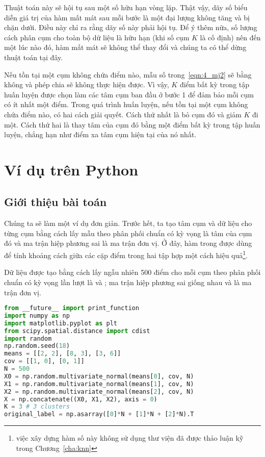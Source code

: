 Thuật toán này sẽ hội tụ sau một số hữu hạn vòng lặp. Thật vậy, dãy số biểu diễn giá trị của hàm mất mát sau mỗi bước là một đại
lượng không tăng và bị chặn dưới. Điều này chỉ ra rằng dãy số này phải hội tụ.
Để ý thêm nữa, số lượng cách phân cụm cho toàn bộ dữ liệu là hữu hạn (khi số
cụm $K$ là cố định) nên đến một lúc nào đó, hàm mất mát sẽ không thể thay
đổi và chúng ta có thể dừng thuật toán tại đây.

Nếu tồn tại một cụm không chứa điểm nào, mẫu số trong~\eqref{eqn:4_mj2} sẽ
bằng không và phép chia sẽ không thực hiện được. Vì vậy, $K$ điểm bất kỳ trong
tập huấn luyện được chọn làm các tâm cụm ban đầu ở bước 1 để đảm bảo mỗi
cụm có ít nhất một điểm. Trong quá trình huấn luyện, nếu tồn tại một cụm
không chứa điểm nào, có hai cách giải quyết. Cách thứ nhất là bỏ cụm đó
và giảm $K$ đi một. Cách thứ hai là thay tâm của cụm đó bằng một điểm
bất kỳ trong tập huấn luyện, chẳng hạn như điểm xa tâm cụm hiện tại của nó nhất.

\section{Ví dụ trên Python}


\subsection{Giới thiệu bài toán}
Chúng ta sẽ làm một ví dụ đơn giản. Trước hết, ta tạo tâm cụm và dữ liệu cho
từng cụm bằng cách lấy mẫu theo phân phối chuẩn có kỳ vọng là tâm của
cụm đó và ma trận hiệp phương sai là ma trận đơn vị. Ở đây, hàm
 trong  được dùng để
tính khoảng cách giữa các cặp điểm trong hai tập hợp một cách hiệu
quả\footnote{việc xây dựng hàm số này không sử dụng thư viện đã được thảo luận
kỹ trong Chương~\ref{cha:knn}}.

Dữ liệu được tạo bằng cách lấy ngẫu nhiên 500 điểm cho mỗi cụm theo phân
phối chuẩn có kỳ vọng lần lượt là  và
; ma trận hiệp phương sai giống nhau và là ma trận đơn vị.
\begin{lstlisting}[language=Python]
from __future__ import print_function
import numpy as np
import matplotlib.pyplot as plt
from scipy.spatial.distance import cdist
import random
np.random.seed(18)
means = [[2, 2], [8, 3], [3, 6]]
cov = [[1, 0], [0, 1]]
N = 500
X0 = np.random.multivariate_normal(means[0], cov, N)
X1 = np.random.multivariate_normal(means[1], cov, N)
X2 = np.random.multivariate_normal(means[2], cov, N)
X = np.concatenate((X0, X1, X2), axis = 0)
K = 3 # 3 clusters
original_label = np.asarray([0]*N + [1]*N + [2]*N).T
\end{lstlisting}


